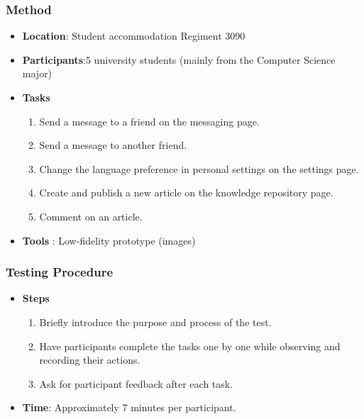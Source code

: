 \documentclass[12pt]{article}
\begin{document}
    \subsubsection*{Method}
        \begin{itemize}
            \item \textbf{Location}: Student accommodation Regiment 3090

            \item\textbf{Participants}:5 university students (mainly from the Computer Science major)

            \item \textbf{Tasks}
                \begin{enumerate}
                    \item Send a message to a friend on the messaging page.
                    \item Send a message to another friend.
                    \item Change the language preference in personal settings on the settings page.
                    \item Create and publish a new article on the knowledge repository page.
                    \item Comment on an article.
                \end{enumerate}

            \item \textbf{Tools} : Low-fidelity prototype (images)

        \end{itemize}

    \subsubsection*{Testing Procedure}
    \begin{itemize}
        \item\textbf{Steps}
            \begin{enumerate}
                \item Briefly introduce the purpose and process of the test.
                \item Have participants complete the tasks one by one while observing and recording their actions.
                \item Ask for participant feedback after each task.
            \end{enumerate}

        \item \textbf{Time}: Approximately 7 minutes per participant.
    \end{itemize}
\end{document}
